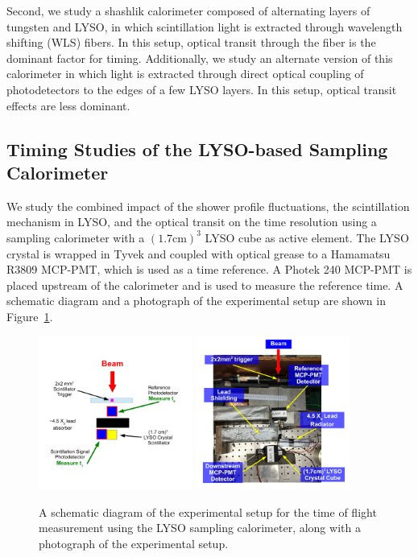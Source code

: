 \documentclass[12pt]{article}
\begin{document}
Second, we study a shashlik calorimeter composed of alternating layers 
of tungsten and LYSO, in which scintillation light is extracted
through wavelength shifting (WLS) fibers. In this setup, optical transit through
the fiber is the dominant factor for timing. Additionally, we
study an alternate version of this calorimeter in which
light is extracted through direct optical coupling of photodetectors
to the edges of a few LYSO layers. In this setup, optical transit effects 
are less dominant.



\subsection{Timing Studies of the LYSO-based Sampling Calorimeter}

We study the combined impact of the shower profile fluctuations,
the scintillation mechanism in LYSO, and the optical transit
on the time resolution using a sampling calorimeter with a
$(1.7\mathrm{cm})^{3}$ LYSO cube as active element. 
The LYSO crystal is wrapped in Tyvek and  
coupled with optical grease to a Hamamatsu R3809 MCP-PMT,
which is used as a time reference. A Photek 240 MCP-PMT is placed 
upstream of the calorimeter and is used to measure the reference 
time. A schematic diagram and a photograph of the experimental 
setup are shown in Figure~\ref{fig:LYSOSamplingCaloSetup}. 

\begin{figure}[h] \centering
\includegraphics[width=0.45\textwidth]{figs/LYSOSamplingCaloSetupSchematic} 
\includegraphics[width=0.45\textwidth]{figs/LYSOSamplingCaloSetupPhoto} 
\caption{ A schematic diagram of the experimental setup for the
time of flight measurement using the LYSO sampling calorimeter, 
along with a photograph of the experimental setup. } 
\label{fig:LYSOSamplingCaloSetup}
\end{figure}
\end{document}
